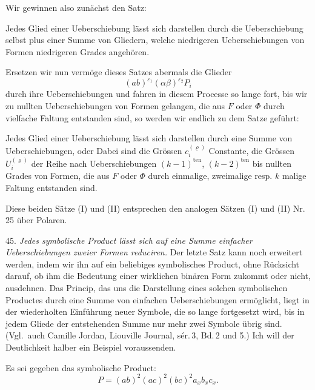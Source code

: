 Wir gewinnen also zunächst den Satz:

\glqq Jedes Glied einer Ueberschiebung lässt sich darstellen durch die
Ueberschiebung selbst plus einer Summe von Gliedern, welche niedrigeren
Ueberschiebungen von Formen niedrigeren Grades angehören.\grqq{}

Ersetzen wir nun vermöge dieses Satzes abermals die Glieder
\[
(ab)^{\varepsilon_1}(\alpha\beta)^{\varepsilon_2}P_i
\]
durch ihre Ueberschiebungen und fahren in diesem Processe so lange fort, bis
wir zu nullten Ueberschiebungen von Formen gelangen, die aus $F$ oder $\Phi$
durch vielfache Faltung entstanden sind, so werden wir endlich zu dem Satze
geführt:

\glqq Jedes Glied einer Ueberschiebung lässt sich darstellen durch eine
Summe von Ueberschiebungen,\grqq{} oder
Dabei sind die Grössen $c_i^{(\varrho)}$ Constante, die Grössen
$U_i^{(\varrho)}$ der Reihe nach Ueberschiebungen $(k-1)^{\mathrm{ten}}$,
$(k-2)^{\mathrm{ten}}$ bis nullten Grades von Formen, die aus $F$ oder
$\Phi$ durch einmalige, zweimalige resp. $k$ malige Faltung entstanden sind.

Diese beiden Sätze (I) und (II) entsprechen den analogen Sätzen (I) und (II)
Nr.\,25 über Polaren.

45. \textit{Jedes symbolische Product lässt sich auf eine Summe einfacher
Ueberschiebungen zweier Formen reduciren.} Der letzte Satz kann noch
erweitert werden, indem wir ihn auf ein beliebiges symbolisches Product,
ohne Rücksicht darauf, ob ihm die Bedeutung einer wirklichen binären Form
zukommt oder nicht, ausdehnen. Das Princip, das uns die Darstellung eines
solchen symbolischen Productes durch eine Summe von einfachen
Ueberschiebungen ermöglicht, liegt in der wiederholten Einführung neuer
Symbole, die so lange fortgesetzt wird, bis in jedem Gliede der
entstehenden Summe nur mehr zwei Symbole übrig sind. (Vgl.\ auch Camille
Jordan, Liouville Journal, sér.\,3, Bd.\,2 und 5.) Ich will der
Deutlichkeit halber ein Beispiel voraussenden.

Es sei gegeben das symbolische Product:
\[
P=(ab)^2(ac)^2(bc)^2 a_x b_x c_x.
\]


